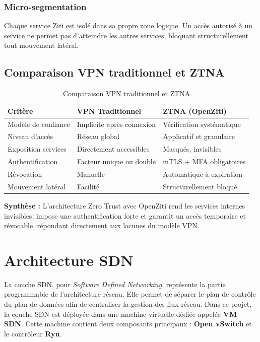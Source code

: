 \documentclass[12pt,a4paper,oneside]{report}
\begin{document}
	\subsubsection{Micro-segmentation}
	
	Chaque service Ziti est isolé dans sa propre zone logique. Un accès autorisé
	à un service ne permet pas d'atteindre les autres services, bloquant
	structurellement tout mouvement latéral.
	
	\subsection{Comparaison VPN traditionnel et ZTNA}
	
	\begin{table}[H]
		\centering
		\caption{Comparaison VPN traditionnel et ZTNA}
		\renewcommand{\arraystretch}{1.4}
		\begin{tabularx}{\textwidth}{|l|X|X|}
			\hline
			\textbf{Critère} & \textbf{VPN Traditionnel} & \textbf{ZTNA (OpenZiti)} \\
			\hline
			Modèle de confiance & Implicite après connexion & Vérification systématique \\
			\hline
			Niveau d'accès & Réseau global & Applicatif et granulaire \\
			\hline
			Exposition services & Directement accessibles & Masqués, invisibles \\
			\hline
			Authentification & Facteur unique ou double & mTLS + MFA obligatoires \\
			\hline
			Révocation & Manuelle & Automatique à expiration \\
			\hline
			Mouvement latéral & Facilité & Structurellement bloqué \\
			\hline
		\end{tabularx}
	\end{table}
	
	\begin{mdframed}[linecolor=black,roundcorner=4pt,innertopmargin=8pt,innerbottommargin=8pt]
		\textbf{Synthèse :} L'architecture Zero Trust avec OpenZiti rend les services
		internes invisibles, impose une authentification forte et garantit un accès
		temporaire et révocable, répondant directement aux lacunes du modèle VPN.
	\end{mdframed}
	
	\section{Architecture SDN}
	La couche SDN, pour \textit{Software Defined Networking}, représente la partie programmable de l'architecture réseau. Elle permet de séparer le plan de contrôle du plan de données afin de centraliser la gestion des flux réseau. Dans ce projet, la couche SDN est déployée dans une machine virtuelle dédiée appelée \textbf{VM SDN}. Cette machine contient deux composants principaux : \textbf{Open vSwitch} et le contrôleur \textbf{Ryu}.
	
\end{document}

